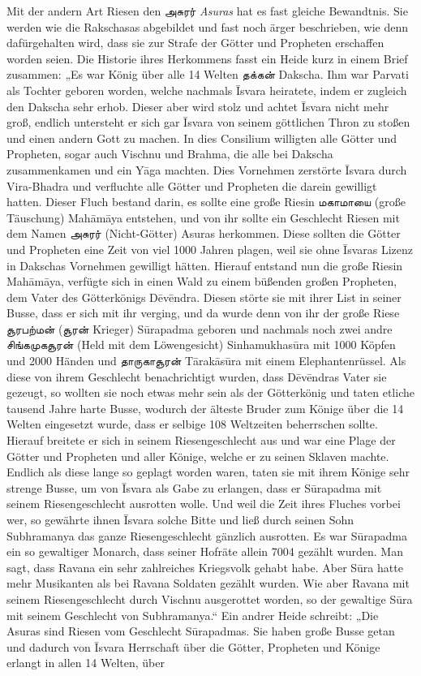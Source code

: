 \documentclass{article}
\newcommand{\TamilText}[1]{\texttamil{#1}}
\newcommand{\tam}[1]{\TamilText{#1}}
\begin{document}
Mit der andern Art Riesen den \tam{அசுரர்} \emph{Asuras} hat es fast gleiche Bewandtnis. Sie werden wie die Rakschasas abgebildet und fast noch ärger beschrieben, wie denn dafürgehalten wird, dass sie zur Strafe der Götter und Propheten erschaffen worden seien. Die Historie ihres Herkommens fasst ein Heide kurz in einem Brief zusammen: „Es war König über alle 14 Welten \tam{தக்கன்} Dakscha. Ihm war Parvati als Tochter geboren worden, welche nachmals \={I}svara heiratete, indem er zugleich den Dakscha sehr erhob. Dieser aber wird stolz und achtet \={I}svara nicht mehr groß, endlich untersteht er sich gar \={I}svara von seinem göttlichen Thron zu stoßen und einen andern Gott zu machen. In dies Consilium willigten alle Götter und Propheten, sogar auch Vischnu und Brahma, die alle bei Dakscha zusammenkamen und ein Y\={a}ga machten. Dies Vornehmen zerstörte \={I}svara durch Vira-Bhadra und verfluchte alle Götter und Propheten die darein gewilligt hatten. Dieser Fluch bestand darin, es sollte eine große Riesin \tam{மகாமாயை} (große Täuschung) Mah\={a}m\={a}ya entstehen, und von ihr sollte ein Geschlecht Riesen mit dem Namen \tam{அசுரர்} (Nicht-Götter) Asuras herkommen. Diese sollten die Götter und Propheten eine Zeit von viel 1000 Jahren plagen, weil sie ohne \={I}svaras Lizenz in Dakschas Vornehmen gewilligt hätten. Hierauf entstand nun die große Riesin Mah\={a}m\={a}ya, verfügte sich in einen Wald zu einem büßenden großen Propheten, dem Vater des Götterkönigs D\={e}v\={e}ndra. Diesen störte sie mit ihrer List in seiner Busse, dass er sich mit ihr verging, und da wurde denn von ihr der große Riese \tam{சூரபற்மன்} (\tam{சூரன்} Krieger) S\={u}rapadma geboren und nachmals noch zwei andre \tam{சிங்கமுகசூரன்} (Held mit dem Löwengesicht) Sinhamukhas\={u}ra mit 1000 Köpfen und 2000 Händen und \tam{தாருகாசூரன்} T\={a}rak\={a}s\={u}ra mit einem Elephantenrüssel. Als diese von ihrem Geschlecht benachrichtigt wurden, dass D\={e}v\={e}ndras Vater sie gezeugt, so wollten sie noch etwas mehr sein als der Götterkönig und taten etliche tausend Jahre harte Busse, wodurch der älteste Bruder zum Könige über die 14 Welten eingesetzt wurde, dass er selbige 108 Weltzeiten beherrschen sollte. Hierauf breitete er sich in seinem Riesengeschlecht aus und war eine Plage der Götter und Propheten und aller Könige, welche er zu seinen Sklaven machte. Endlich als diese lange so geplagt worden waren, taten sie mit ihrem Könige sehr strenge Busse, um von \={I}svara als Gabe zu erlangen, dass er S\={u}rapadma mit seinem Riesengeschlecht ausrotten wolle. Und weil die Zeit ihres Fluches vorbei wer, so gewährte ihnen \={I}svara solche Bitte und ließ durch seinen Sohn Subhramanya das ganze Riesengeschlecht gänzlich ausrotten. Es war S\={u}rapadma ein so gewaltiger Monarch, dass seiner Hofräte allein 7004 gezählt wurden. Man sagt, dass Ravana ein sehr zahlreiches Kriegsvolk gehabt habe. Aber S\={u}ra hatte mehr Musikanten als bei Ravana Soldaten gezählt wurden. Wie aber Ravana mit seinem Riesengeschlecht durch Vischnu ausgerottet worden, so der gewaltige S\={u}ra mit seinem Geschlecht von Subhramanya.“ Ein andrer Heide schreibt: „Die Asuras sind Riesen vom Geschlecht S\={u}rapadmas. Sie haben große Busse getan und dadurch von \={I}svara Herrschaft über die Götter, Propheten und Könige erlangt in allen 14 Welten, über 
\end{document}
